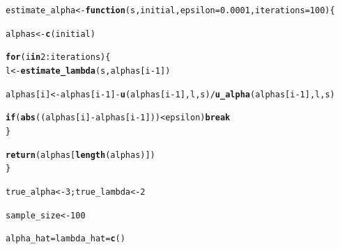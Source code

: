 \documentclass[11pt, a4paper]{article}\usepackage[]{graphicx}\usepackage[]{xcolor}
\makeatletter
\newcommand{\hlnum}[1]{\textcolor[rgb]{0.686,0.059,0.569}{#1}}%
\newcommand{\hlopt}[1]{\textcolor[rgb]{0,0,0}{#1}}%
\newcommand{\hldef}[1]{\textcolor[rgb]{0.345,0.345,0.345}{#1}}%
\newcommand{\hlkwa}[1]{\textcolor[rgb]{0.161,0.373,0.58}{\textbf{#1}}}%
\newcommand{\hlkwb}[1]{\textcolor[rgb]{0.69,0.353,0.396}{#1}}%
\newcommand{\hlkwc}[1]{\textcolor[rgb]{0.333,0.667,0.333}{#1}}%
\newcommand{\hlkwd}[1]{\textcolor[rgb]{0.737,0.353,0.396}{\textbf{#1}}}%
\newenvironment{kframe}{%
 \def\at@end@of@kframe{}%
 \ifinner\ifhmode%
  \def\at@end@of@kframe{\end{minipage}}%
  \begin{minipage}{\columnwidth}%
 \fi\fi%
 \def\FrameCommand##1{\hskip\@totalleftmargin \hskip-\fboxsep
 \colorbox{shadecolor}{##1}\hskip-\fboxsep
     \hskip-\linewidth \hskip-\@totalleftmargin \hskip\columnwidth}%
 \MakeFramed {\advance\hsize-\width
   \@totalleftmargin\z@ \linewidth\hsize
   \@setminipage}}%
 {\par\unskip\endMakeFramed%
 \at@end@of@kframe}
\newenvironment{knitrout}{}{} %
\makeatother
\begin{document}
\begin{knitrout}
\color{fgcolor}\begin{kframe}
\begin{alltt}
\hldef{estimate_alpha} \hlkwb{<-} \hlkwa{function}\hldef{(}\hlkwc{s}\hldef{,} \hlkwc{initial}\hldef{,} \hlkwc{epsilon} \hldef{=} \hlnum{0.0001}\hldef{,} \hlkwc{iterations} \hldef{=} \hlnum{100}\hldef{)\{}

  \hldef{alphas} \hlkwb{<-} \hlkwd{c}\hldef{(initial)}

  \hlkwa{for} \hldef{(i} \hlkwa{in} \hlnum{2}\hlopt{:}\hldef{iterations) \{}
    \hldef{l} \hlkwb{<-} \hlkwd{estimate_lambda}\hldef{(s, alphas[i}\hlopt{-}\hlnum{1}\hldef{])}

    \hldef{alphas[i]} \hlkwb{<-} \hldef{alphas[i}\hlopt{-}\hlnum{1}\hldef{]} \hlopt{-} \hlkwd{u}\hldef{(alphas[i}\hlopt{-}\hlnum{1}\hldef{], l, s)} \hlopt{/} \hlkwd{u_alpha}\hldef{(alphas[i}\hlopt{-}\hlnum{1}\hldef{], l, s)}

    \hlkwa{if}\hldef{(}\hlkwd{abs}\hldef{((alphas[i]} \hlopt{-} \hldef{alphas[i}\hlopt{-}\hlnum{1}\hldef{]))} \hlopt{<} \hldef{epsilon)} \hlkwa{break}
  \hldef{\}}

  \hlkwd{return}\hldef{(alphas[}\hlkwd{length}\hldef{(alphas)])}
\hldef{\}}
\end{alltt}
\end{kframe}
\end{knitrout}

\begin{knitrout}
\color{fgcolor}\begin{kframe}
\begin{alltt}
\hldef{true_alpha} \hlkwb{<-} \hlnum{3}\hldef{; true_lambda} \hlkwb{<-} \hlnum{2}
\end{alltt}
\end{kframe}
\end{knitrout}

\begin{knitrout}
\color{fgcolor}\begin{kframe}
\begin{alltt}
\hldef{sample_size} \hlkwb{<-} \hlnum{100}
\end{alltt}
\end{kframe}
\end{knitrout}

\begin{knitrout}
\color{fgcolor}\begin{kframe}
\begin{alltt}
\hldef{alpha_hat} \hlkwb{=} \hldef{lambda_hat} \hlkwb{=} \hlkwd{c}\hldef{()}
\end{alltt}
\end{kframe}
\end{knitrout}
\end{document}
